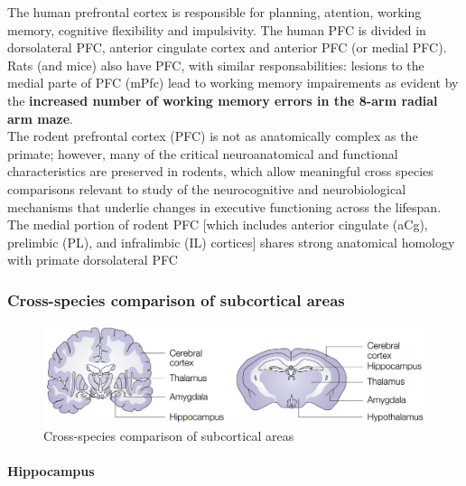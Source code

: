 \documentclass[12pt,article,oneside,a4paper]{memoir}
\begin{document}
The human prefrontal cortex is responsible for planning, atention, working memory, cognitive flexibility and impulsivity. The human PFC is divided in dorsolateral PFC, anterior cingulate cortex and anterior PFC (or medial PFC). Rats (and mice) also have PFC, with similar responsabilities: lesions to the medial parte of PFC (mPfc) lead to working memory impairements as evident by the \textbf{increased number of working	memory errors in the 8-arm radial arm maze}.
\\
The rodent prefrontal cortex (PFC) is not as anatomically complex as the primate; however,
many of the critical neuroanatomical and functional characteristics are preserved in
rodents, which allow meaningful cross species comparisons relevant to study of the
neurocognitive and neurobiological mechanisms that underlie changes in executive
functioning across the lifespan. The medial portion of rodent PFC [which includes anterior cingulate (aCg), prelimbic (PL), and infralimbic (IL) cortices] shares strong anatomical homology with primate dorsolateral PFC

\subsubsection{Cross-species comparison of subcortical areas}
\begin{figure}[H]
	\centering
  	\includegraphics[width=\linewidth]{imgs/subcorticalAreas.png}
	\caption{Cross-species comparison of subcortical areas}
  	\label{fig:subcorticalAreas}
\end{figure}
	
\paragraph{Hippocampus}
\end{document}
